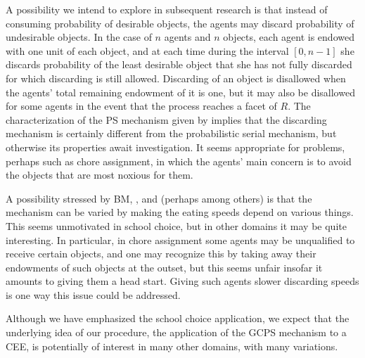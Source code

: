 \documentclass[12pt]{article}
\theoremstyle{definition}
\begin{document}
A possibility we intend to explore in subsequent research is that instead of consuming probability of desirable objects, the agents may discard probability of undesirable objects.  In the case of $n$ agents and $n$ objects, each agent is endowed with one unit of each object, and at each time during the interval $[0,n-1]$ she discards probability of the least desirable object that she has not fully discarded for which discarding is still allowed.  Discarding of an object is disallowed when the agents' total remaining endowment of it is one, but it may also be disallowed for some agents in the event that the process reaches a facet of $R$.  The characterization of the PS mechanism given by \cite{bh12} implies that the discarding mechanism is certainly different from the probabilistic serial mechanism, but otherwise its properties await investigation.  It seems appropriate for problems, perhaps such as chore assignment, in which the agents' main concern is to avoid the objects that are most noxious for them.

A possibility stressed by BM, \cite{cho18scw}, and \cite{balbuzanov22jet} (perhaps among others) is that the mechanism can be varied by making the eating speeds depend on various things.  This seems unmotivated in school choice, but in other domains it may be quite interesting.    In particular, in chore assignment some agents may be unqualified to receive certain objects, and one may recognize this by taking away their endowments of such objects at the outset, but this seems unfair insofar it amounts to giving them a head start.  Giving such agents slower discarding speeds is one way this issue could be addressed. 

Although we have emphasized the school choice application, we expect that the underlying idea of our procedure, the application of the GCPS mechanism to a CEE, is potentially of interest in many other domains, with many variations.  
\end{document}
